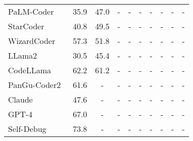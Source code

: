 \documentclass[11pt]{article}
\begin{document}
\begin{table*}[h]
\begin{tabular}{l|ccccc|cccc}
PaLM-Coder~\cite{chowdhery2022palm}                      & \multicolumn{1}{c|}{35.9}               & \multicolumn{1}{c|}{47.0}          & -             & -             & -             & -             & -             & -             & -             \\
StarCoder~\cite{li2023starcoder}                       & \multicolumn{1}{c|}{40.8}               & \multicolumn{1}{c|}{49.5}          & -             & -             & -             & -             & -             & -             & -             \\
WizardCoder~\cite{luo2023wizardcoder}                     & \multicolumn{1}{c|}{57.3}               & \multicolumn{1}{c|}{51.8}          & -             & -             & -             & -             & -             & -             & -             \\
LLama2~\cite{touvron2023llama}                          & \multicolumn{1}{c|}{30.5}               & \multicolumn{1}{c|}{45.4}          & -             & -             & -             & -             & -             & -             & -             \\
CodeLLama~\cite{roziere2023code}                       & \multicolumn{1}{c|}{62.2}               & \multicolumn{1}{c|}{61.2}          & -             & -             & -             & -             & -             & -             & -             \\
PanGu-Coder2~\cite{shen2023pangucoder2}                    & \multicolumn{1}{c|}{61.6}               & \multicolumn{1}{c|}{-}             & -             & -             & -             & -             & -             & -             & -             \\
Claude~\cite{Claude}                          & \multicolumn{1}{c|}{47.6}               & \multicolumn{1}{c|}{-}             & -             & -             & -             & -             & -             & -             & -             \\
GPT-4~\cite{openai2023gpt4}                           & \multicolumn{1}{c|}{67.0}               & \multicolumn{1}{c|}{-}             & -             & -             & -             & -             & -             & -             & -             \\
Self-Debug~\cite{chen2023teaching}                      & \multicolumn{1}{c|}{73.8}               & \multicolumn{1}{c|}{-}             & -             & -             & -             & -             & -             & -             & -             \\

\end{tabular}
\end{table*}
\end{document}
